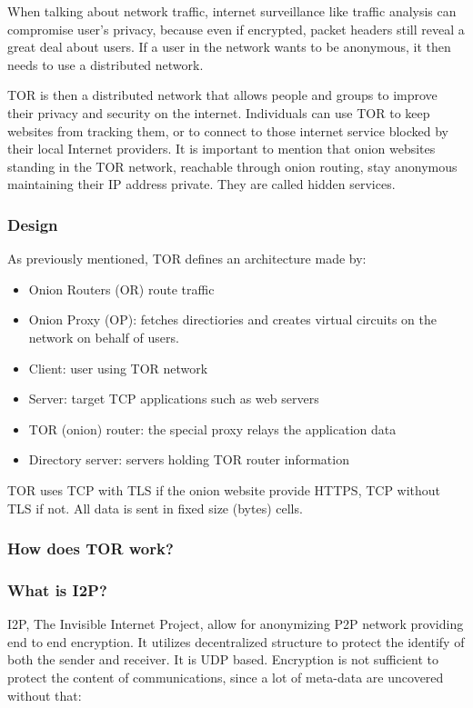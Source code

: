 When talking about network traffic, internet surveillance like traffic analysis can compromise user's privacy, because even if encrypted, packet headers still reveal a great deal about users. If a user in the network wants to be anonymous, it then needs to use a distributed network.

TOR is then a distributed network that allows people and groups to improve their privacy and security on the internet. \newline
Individuals can use TOR to keep websites from tracking them, or to connect to those internet service blocked by their local Internet providers. It is important to mention that onion websites standing in the TOR network, reachable through onion routing, stay anonymous maintaining their IP address private. They are called hidden services.

\subsubsection{Design}
As previously mentioned, TOR defines an architecture made by:

\begin{itemize}
    \item Onion Routers (OR) route traffic
    \item Onion Proxy (OP): fetches directiories and creates virtual circuits on the network on behalf of users. 
    \item Client: user using TOR network
    \item Server: target TCP applications such as web servers
    \item TOR (onion) router: the special proxy relays the application data
    \item Directory server: servers holding TOR router information
\end{itemize}

TOR uses TCP with TLS if the onion website provide HTTPS, TCP without TLS if not. All data is sent in fixed size (bytes) cells. 

\subsubsection{How does TOR work?}

\subsubsection{What is I2P?}

I2P, The Invisible Internet Project, allow for anonymizing P2P network providing end to end encryption. It utilizes decentralized structure to protect the identify of both the sender and receiver. It is UDP based. \newline
Encryption is not sufficient to protect the content of communications, since a lot of meta-data are uncovered without that:

